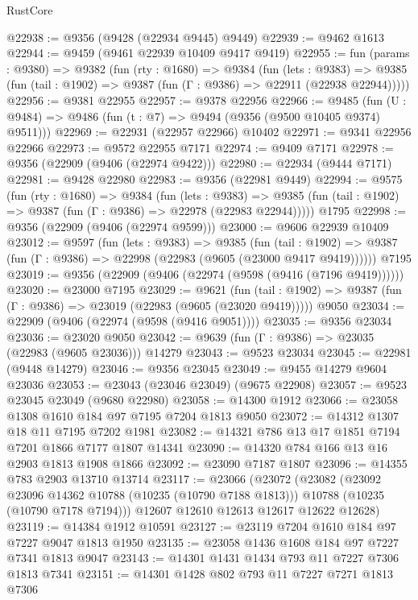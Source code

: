 \begin{lexlean}{RustCore}
\begin{coremodule}
@22938 := @9356 (@9428 (@22934 @9445) @9449)
@22939 := @9462 @1613
@22944 := @9459 (@9461 @22939 @10409 @9417 @9419)
@22955 := fun (params : @9380) =>
  @9382
    (fun (rty : @1680) =>
    @9384
      (fun (lets : @9383) =>
      @9385 (fun (tail : @1902) => @9387 (fun (Γ : @9386) => @22911 (@22938 @22944)))))
@22956 := @9381 @22955
@22957 := @9378 @22956
@22966 := @9485
    (fun (U : @9484) => @9486 (fun (t : @7) => @9494 (@9356 (@9500 @10405 @9374) @9511)))
@22969 := @22931 (@22957 @22966) @10402
@22971 := @9341 @22956 @22966
@22973 := @9572 @22955 @7171
@22974 := @9409 @7171
@22978 := @9356 (@22909 (@9406 (@22974 @9422)))
@22980 := @22934 (@9444 @7171)
@22981 := @9428 @22980
@22983 := @9356 (@22981 @9449)
@22994 := @9575
    (fun (rty : @1680) =>
    @9384
      (fun (lets : @9383) =>
      @9385 (fun (tail : @1902) => @9387 (fun (Γ : @9386) => @22978 (@22983 @22944)))))
    @1795
@22998 := @9356 (@22909 (@9406 (@22974 @9599)))
@23000 := @9606 @22939 @10409
@23012 := @9597
    (fun (lets : @9383) =>
    @9385
      (fun (tail : @1902) =>
      @9387 (fun (Γ : @9386) => @22998 (@22983 (@9605 (@23000 @9417 @9419))))))
    @7195
@23019 := @9356 (@22909 (@9406 (@22974 (@9598 (@9416 (@7196 @9419))))))
@23020 := @23000 @7195
@23029 := @9621
    (fun (tail : @1902) => @9387 (fun (Γ : @9386) => @23019 (@22983 (@9605 (@23020 @9419)))))
    @9050
@23034 := @22909 (@9406 (@22974 (@9598 (@9416 @9051))))
@23035 := @9356 @23034
@23036 := @23020 @9050
@23042 := @9639 (fun (Γ : @9386) => @23035 (@22983 (@9605 @23036))) @14279
@23043 := @9523 @23034
@23045 := @22981 (@9448 @14279)
@23046 := @9356 @23045
@23049 := @9455 @14279 @9604 @23036
@23053 := @23043 (@23046 @23049) (@9675 @22908)
@23057 := @9523 @23045 @23049 (@9680 @22980)
@23058 := @14300 @1912
@23066 := @23058 @1308 @1610 @184 @97 @7195 @7204 @1813 @9050
@23072 := @14312 @1307 @18 @11 @7195 @7202 @1981
@23082 := @14321 @786 @13 @17 @1851 @7194 @7201 @1866 @7177 @1807 @14341
@23090 := @14320 @784 @166 @13 @16 @2903 @1813 @1908 @1866
@23092 := @23090 @7187 @1807
@23096 := @14355 @783 @2903 @13710 @13714
@23117 := @23066
    (@23072
      (@23082
        (@23092 @23096 @14362 @10788 (@10235 (@10790 @7188 @1813)))
        @10788
        (@10235 (@10790 @7178 @7194)))
      @12607
      @12610
      @12613
      @12617
      @12622
      @12628)
@23119 := @14384 @1912 @10591
@23127 := @23119 @7204 @1610 @184 @97 @7227 @9047 @1813 @1950
@23135 := @23058 @1436 @1608 @184 @97 @7227 @7341 @1813 @9047
@23143 := @14301 @1431 @1434 @793 @11 @7227 @7306 @1813 @7341
@23151 := @14301 @1428 @802 @793 @11 @7227 @7271 @1813 @7306

\end{coremodule}
\end{lexlean}

